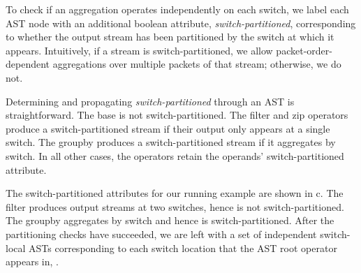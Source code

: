 To check if an aggregation operates independently on each switch, we label each
AST node with an additional boolean attribute, {\em switch-partitioned},
corresponding to whether the output stream has been partitioned by the switch
at which it appears. Intuitively, if a stream is switch-partitioned, we allow
packet-order-dependent aggregations over multiple packets of that stream;
otherwise, we do not.

Determining and propagating {\em switch-partitioned} through an AST is
straightforward. The base {\ct \pktlog} is not switch-partitioned. The {\ct
  filter} and {\ct zip} operators produce a switch-partitioned stream if their
output only appears at a single switch. The {\ct groupby} produces a
switch-partitioned stream if it aggregates by {\ct switch.} In all other cases,
the operators retain the operands' switch-partitioned attribute.

The switch-partitioned attributes for our running example are shown in
c. The {\ct filter} produces output streams at
two switches, hence is not switch-partitioned. The {\ct groupby} aggregates by
{\ct switch} and hence is switch-partitioned. After the partitioning checks have
succeeded, we are left with a set of independent switch-local ASTs corresponding
to each switch location that the AST root operator appears in, .
